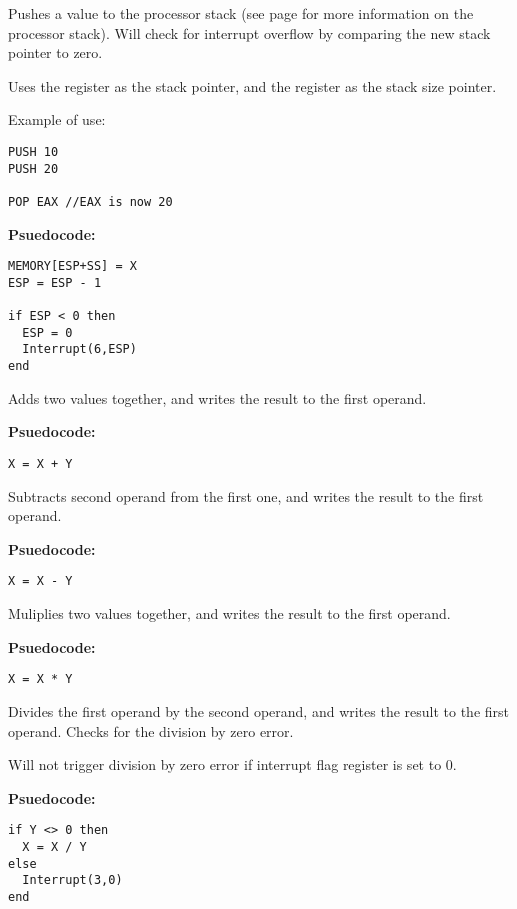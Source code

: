 Pushes a value to the processor stack (see page \pageref{stack} for more information on the processor stack). Will check for interrupt overflow by comparing the new stack pointer to zero.

Uses the  register as the stack pointer, and the  register as the stack size pointer.

Example of use:
\begin{verbatim}
PUSH 10
PUSH 20

POP EAX //EAX is now 20
\end{verbatim}


\textbf{Psuedocode:}
\begin{verbatim}
MEMORY[ESP+SS] = X
ESP = ESP - 1

if ESP < 0 then
  ESP = 0
  Interrupt(6,ESP)
end
\end{verbatim}


Adds two values together, and writes the result to the first operand.

\textbf{Psuedocode:}
\begin{verbatim}
X = X + Y
\end{verbatim}


Subtracts second operand from the first one, and writes the result to the first operand.

\textbf{Psuedocode:}
\begin{verbatim}
X = X - Y
\end{verbatim}


Muliplies two values together, and writes the result to the first operand.

\textbf{Psuedocode:}
\begin{verbatim}
X = X * Y
\end{verbatim}


Divides the first operand by the second operand, and writes the result to the first operand. Checks for the division by zero error.


Will not trigger division by zero error if interrupt flag register  is set to 0.

\textbf{Psuedocode:}
\begin{verbatim}
if Y <> 0 then
  X = X / Y
else
  Interrupt(3,0)
end
\end{verbatim}



